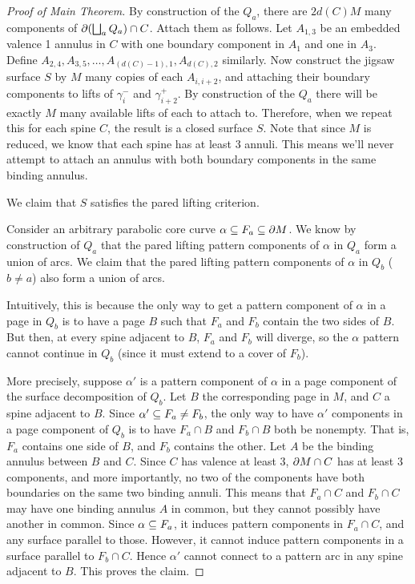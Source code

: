 \begin{proof}[Proof of Main Theorem]
By construction of the $Q_a$, there are $2d(C)M$ many components of
$\partial(\bigsqcup_a Q_a) \cap C$. Attach them as follows. Let $A_{1,3}$ be an
embedded valence 1 annulus in $C$ with one boundary component in $A_1$ and one
in $A_3$. Define $A_{2,4},A_{3,5},\dots,A_{(d(C)-1),1},A_{d(C),2}$ similarly.
Now construct the jigsaw surface $S$ by $M$ many copies of each
$A_{i,i+2}$, and attaching their boundary components to lifts of $\gamma_i^-$
and $\gamma_{i+2}^+$. By construction of the $Q_a$ there will be exactly $M$
many available lifts of each to attach to. Therefore, when we repeat this for
each spine $C$, the result is a closed surface $S$. Note that since $M$ is
reduced, we know that each spine has at least 3 annuli. This means we'll never
attempt to attach an annulus with both boundary components in the same binding
annulus.

We claim that $S$ satisfies the pared lifting criterion.

Consider an arbitrary parabolic core curve $\alpha \subseteq F_a \subseteq \partial M$. We
know by construction of $Q_a$ that the pared lifting pattern components of
$\alpha$ in $Q_a$ form a union of arcs.  We claim that the pared lifting
pattern components of $\alpha$ in $Q_b$ ($b \neq a$) also form a union of arcs.

Intuitively, this is because the only way to get a pattern component of
$\alpha$ in a page in $Q_b$ is to have a page $B$ such that $F_a$ and $F_b$
contain the two sides of $B$.  But then, at every spine adjacent to $B$, $F_a$
and $F_b$ will diverge, so the $\alpha$ pattern cannot continue in $Q_b$ (since
it must extend to a cover of $F_b$).

More precisely, suppose $\alpha'$ is a pattern component of $\alpha$ in a page
component of the surface decomposition of $Q_b$. Let $B$ the corresponding page
in $M$, and $C$ a spine adjacent to $B$. Since $\alpha' \subseteq F_a \neq F_b$, the
only way to have $\alpha'$ components in a page component of $Q_b$ is to have
$F_a \cap B$ and $F_b \cap B$ both be nonempty. That is, $F_a$ contains one
side of $B$, and $F_b$ contains the other. Let $A$ be the binding annulus
between $B$ and $C$.  Since $C$ has valence at least 3, $\partial M \cap C$ has at
least 3 components, and more importantly, no two of the components have both
boundaries on the same two binding annuli. This means that $F_a \cap C$ and
$F_b \cap C$ may have one binding annulus $A$ in common, but they cannot
possibly have another in common.  Since $\alpha \subseteq F_a$, it induces pattern
components in $F_a \cap C$, and any surface parallel to those. However, it
cannot induce pattern components in a surface parallel to $F_b \cap C$. Hence
$\alpha'$ cannot connect to a pattern arc in any spine adjacent to $B$. This
proves the claim.


\end{proof}
